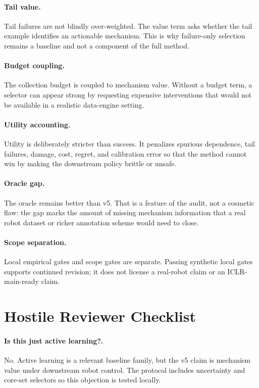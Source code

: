 \documentclass{article}
\begin{document}
\paragraph{Tail value.} Tail failures are not blindly over-weighted. The value term asks whether the tail example identifies an actionable mechanism. This is why failure-only selection remains a baseline and not a component of the full method.
\paragraph{Budget coupling.} The collection budget is coupled to mechanism value. Without a budget term, a selector can appear strong by requesting expensive interventions that would not be available in a realistic data-engine setting.
\paragraph{Utility accounting.} Utility is deliberately stricter than success. It penalizes spurious dependence, tail failures, damage, cost, regret, and calibration error so that the method cannot win by making the downstream policy brittle or unsafe.
\paragraph{Oracle gap.} The oracle remains better than v5. That is a feature of the audit, not a cosmetic flaw: the gap marks the amount of missing mechanism information that a real robot dataset or richer annotation scheme would need to close.
\paragraph{Scope separation.} Local empirical gates and scope gates are separate. Passing synthetic local gates supports continued revision; it does not license a real-robot claim or an ICLR-main-ready claim.
\clearpage
\section{Hostile Reviewer Checklist}
\paragraph{Is this just active learning?.} No. Active learning is a relevant baseline family, but the v5 claim is mechanism value under downstream robot control. The protocol includes uncertainty and core-set selectors so this objection is tested locally.
\end{document}
